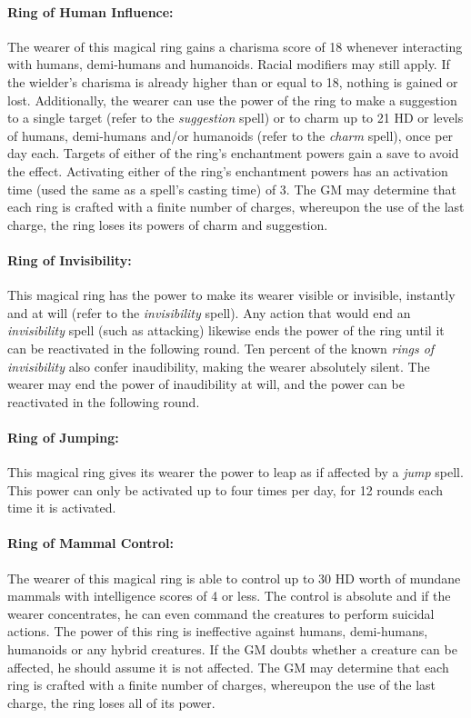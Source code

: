 \begin{multicols}{2}
\paragraph{Ring of Human Influence:} The wearer of this magical ring gains a charisma score of 18 whenever interacting with humans, demi-humans and humanoids.  Racial modifiers may still apply.  If the wielder's charisma is already higher than or equal to 18, nothing is gained or lost.  Additionally, the wearer can use the power of the ring to make a suggestion to a single target (refer to the \textit{suggestion} spell) or to charm up to 21 HD or levels of humans, demi-humans and/or humanoids (refer to the \textit{charm} spell), once per day each.  Targets of either of the ring's enchantment powers gain a save to avoid the effect.  Activating either of the ring's enchantment powers has an activation time (used the same as a spell's casting time) of 3.  The GM may determine that each ring is crafted with a finite number of charges, whereupon the use of the last charge, the ring loses its powers of charm and suggestion.

\paragraph{Ring of Invisibility:} This magical ring has the power to make its wearer visible or invisible, instantly and at will (refer to the \textit{invisibility} spell).  Any action that would end an \textit{invisibility} spell (such as attacking) likewise ends the power of the ring until it can be reactivated in the following round.  Ten percent of the known \textit{rings of invisibility} also confer inaudibility, making the wearer absolutely silent.  The wearer may end the power of inaudibility at will, and the power can be reactivated in the following round.

\paragraph{Ring of Jumping:} This magical ring gives its wearer the power to leap as if affected by a \textit{jump} spell.  This power can only be activated up to four times per day, for 12 rounds each time it is activated.

\paragraph{Ring of Mammal Control:} The wearer of this magical ring is able to control up to 30 HD worth of mundane mammals with intelligence scores of 4 or less.  The control is absolute and if the wearer concentrates, he can even command the creatures to perform suicidal actions.  The power of this ring is ineffective against humans, demi-humans, humanoids or any hybrid creatures.  If the GM doubts whether a creature can be affected, he should assume it is not affected.  The GM may determine that each ring is crafted with a finite number of charges, whereupon the use of the last charge, the ring loses all of its power.


\end{multicols}
